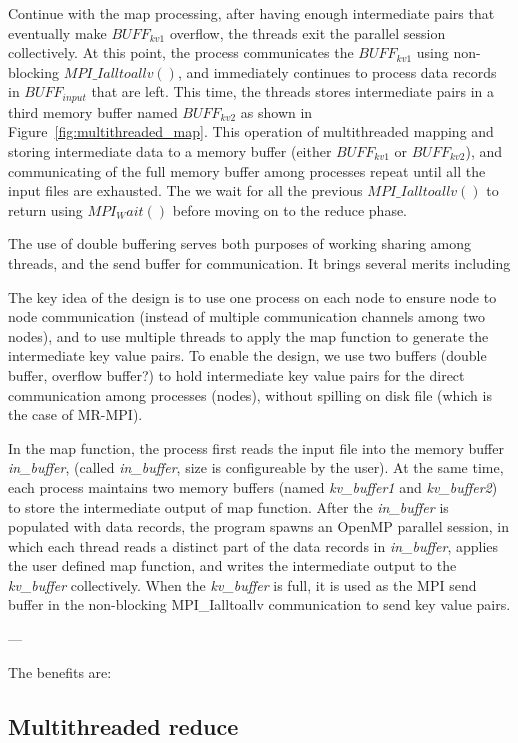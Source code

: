 Continue with the map processing, after having enough 
intermediate pairs that eventually make $BUFF_{kv1}$ overflow,
the threads exit the parallel session collectively. At this point,
the process communicates the $BUFF_{kv1}$ using 
non-blocking $MPI\_Ialltoallv()$, and immediately continues to process 
data records in $BUFF_{input}$ that are left.
This time, the threads stores intermediate pairs in a third 
memory buffer named $BUFF_{kv2}$ as shown in Figure~\ref{fig:multithreaded_map}.
This operation of multithreaded mapping and storing intermediate
data to a memory buffer (either $BUFF_{kv1}$ or $BUFF_{kv2}$), and
communicating of the full memory buffer among processes
repeat until all the input files are exhausted. The we
wait for all the previous $MPI\_Ialltoallv()$ to return using $MPI_Wait()$
before moving on to the reduce phase. 
 
The use of double buffering serves both purposes of working sharing
among threads, and the send buffer for communication. It 
brings several merits including


The key idea of the design is to use one process on each node to ensure
node to node communication (instead of multiple communication channels
among two nodes), and to use multiple threads to apply the map function
to generate the intermediate key value pairs. To enable the design, we 
use two buffers (double buffer, overflow buffer?) to hold intermediate 
key value pairs for the direct communication among processes (nodes), without
spilling on disk file (which is the case of MR-MPI).

In the map function, the process first reads the input
file into the memory buffer \textit{in\_buffer}, (called \textit{in\_buffer}, size is configureable 
by the user). At the same time, each process
maintains two memory buffers (named \textit{kv\_buffer1} and \textit{kv\_buffer2}) 
to store the intermediate output of map function. After the \textit{in\_buffer} is
populated with data records, the program spawns an OpenMP parallel
session, in which each thread reads a distinct part of the data records
in \textit{in\_buffer}, applies the user defined map function, and writes the
intermediate output to the \textit{kv\_buffer} collectively. When the 
\textit{kv\_buffer} is full, it is used as the MPI send buffer in the non-blocking
MPI\_Ialltoallv communication to send key value pairs. 

---

The benefits are:


\subsection{Multithreaded reduce}

